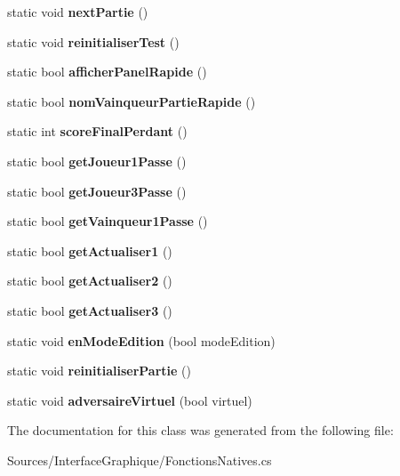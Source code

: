 \begin{DoxyCompactItemize}
static void {\bfseries next\+Partie} ()
\item 
static void {\bfseries reinitialiser\+Test} ()
\item 
static bool {\bfseries afficher\+Panel\+Rapide} ()
\item 
static bool {\bfseries nom\+Vainqueur\+Partie\+Rapide} ()
\item 
static int {\bfseries score\+Final\+Perdant} ()
\item 
static bool {\bfseries get\+Joueur1\+Passe} ()
\item 
static bool {\bfseries get\+Joueur3\+Passe} ()
\item 
static bool {\bfseries get\+Vainqueur1\+Passe} ()
\item 
static bool {\bfseries get\+Actualiser1} ()
\item 
static bool {\bfseries get\+Actualiser2} ()
\item 
static bool {\bfseries get\+Actualiser3} ()
\item 
static void {\bfseries en\+Mode\+Edition} (bool mode\+Edition)
\item 
static void {\bfseries reinitialiser\+Partie} ()
\item 
static void {\bfseries adversaire\+Virtuel} (bool virtuel)
\end{DoxyCompactItemize}


The documentation for this class was generated from the following file\+:\begin{DoxyCompactItemize}
\item 
Sources/\+Interface\+Graphique/Fonctions\+Natives.\+cs\end{DoxyCompactItemize}
